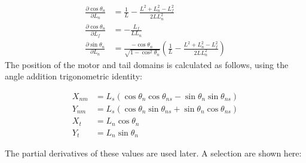 \documentclass[
11pt, %
english, %
singlespacing, %
headsepline, %
chapterinoneline, %
]{MastersDoctoralThesis} %
\begin{document}
\begin{align}
  \frac{\partial \cos\theta_n}{\partial L_n} &= \frac{1}{L} - \frac{L^2 + L_n^2 - L_f^2}{2L L_n^2}\\
  \frac{\partial \cos\theta_n}{\partial L_f} &= -\frac{L_f}{LL_n}\\
  \frac{\partial \sin\theta_n}{\partial L_n} &= \frac{-\cos\theta_n}{\sqrt{1-\cos^2\theta_n}}
  \left(\frac{1}{L} - \frac{L^2 + L_n^2 - L_f^2}{2L L_n^2}\right)
\end{align}
%
The position of the motor and tail domains is calculated as follows, using the angle addition trigonometric identity:

\begin{align}
  X_{nm} &= L_s\left(
  \cos\theta_n\cos\theta_{ns} - \sin\theta_n\sin\theta_{ns}
  \right)
  \\
  Y_{nm} &= L_s\left(
  \cos\theta_n\sin\theta_{ns} + \sin\theta_n\cos\theta_{ns}
  \right)
  \\
  X_{t} &= L_n\cos\theta_n\\
  Y_{t} &= L_n\sin\theta_n
\end{align}

The partial derivatives of these values are used later. A selection are shown here:
\end{document}
